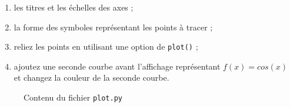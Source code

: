 \begin{enumerate}
\item les titres et les échelles des axes ;

\item la forme des  symboles représentant les points à tracer ;

\item reliez les points en utilisant une option de \texttt{plot()} ;

\item ajoutez une seconde courbe avant l'affichage représentant $f(x)=cos(x)$ et changez la couleur
  de la seconde courbe.


\end{enumerate}
\begin{figure}  
  
  \caption{Contenu du fichier \texttt{plot.py}}
\end{figure}










\vfill
